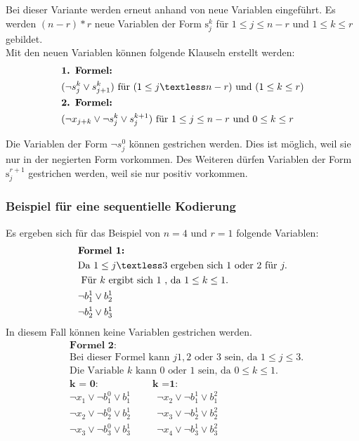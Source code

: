 \documentclass[a4,abstract=on]{scrartcl}
\begin{document}
Bei dieser Variante werden erneut anhand von \cite[][]{knuth} neue Variablen eingeführt. Es werden $(n-r)*r$ neue Variablen der Form $\text{s}_j^k$ für $1 \leq j \leq n - r$ und $1 \leq k \leq r$ gebildet. \\
Mit den neuen Variablen können folgende Klauseln erstellt werden:\\

\begin{align*}
&\textbf{1. Formel:}\\
&(\neg s_j^k \vee s_{j+1}^k) \text{ für } (1 \leq j \textless n - r) \text{ und } (1 \leq k \leq r)\\
&\textbf{2. Formel:}\\
&(\neg x_{j+k} \vee \neg s_j^k \vee s_j^{k+1}) \text{ für } 1 \leq j \leq n - r \text{ und } 0 \leq k \leq r\\
\end{align*}

Die Variablen der Form  $\neg s_j^0$ können gestrichen werden. Dies ist möglich, weil sie nur in der negierten Form vorkommen. Des Weiteren dürfen Variablen der Form $\text{s}_j^{r+1}$ gestrichen werden, weil sie nur positiv vorkommen.

	\subsubsection*{Beispiel für eine sequentielle Kodierung}
Es ergeben sich für das Beispiel von $n=4$ und $r=1$ folgende Variablen:\\

\begin{align*}
&\textbf{Formel 1:}\\
& \text{Da } 1 \leq j \textless 3 \text{ ergeben sich } 1 \text{ oder } 2 \text{ für } j.\\
&\text{ Für } k \text{ ergibt sich } 1 \text{ , da } 1 \leq k \leq 1.\\
&\neg b_1^1 \vee b_2^1\\
&\neg b_2^1 \vee b_3^1\\
\end{align*}
In diesem Fall können keine Variablen gestrichen werden.\\

\begin{align*}
&\textbf{Formel 2:}\\
& \text{Bei dieser Formel kann } j 1, 2 \text{ oder } 3 \text{ sein, da }1 \leq j \leq 3. \\
&\text{Die Variable } k \text{ kann } 0 \text{ oder } 1 \text{ sein, da } 0 \leq k \leq 1.\\
&\textbf{k = 0:} {~~~~~~~~~~~~~~~~~~~~~~~~~} \textbf{k =1:}\\
&\neg x_1 \vee \neg b_1^0 \vee b_1^1 {~~~~~~~~~~~~}\neg x_2 \vee \neg b_1^1 \vee b_1^2\\
&\neg x_2 \vee \neg b_2^0 \vee b_2^1 {~~~~~~~~~~~~} \neg x_3 \vee \neg b_2^1 \vee b_2^2\\
&\neg x_3 \vee \neg b_3^0 \vee b_3^1 {~~~~~~~~~~~~} \neg x_4 \vee \neg b_3^1 \vee b_3^2\\
\end{align*}
\end{document}

